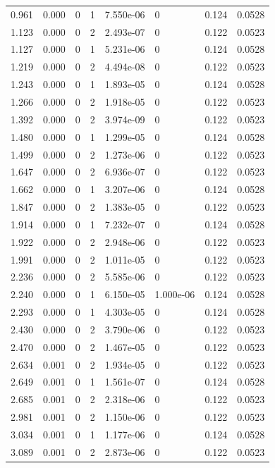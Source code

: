 \documentclass[preview]{standalone}
\begin{document}
{{\begin{tabular}{L{1.2cm}C{1.2cm} C{0.3cm}C{0.5cm} C{1.4cm}C{1.4cm} C{1.4cm}C{1.4cm}}
  0.961  &  0.000  & 0     &  1 &  7.550e-06  & 0  & 0.124 &  0.0528   \\ 
  1.123  &  0.000  & 0     &  2 &  2.493e-07  & 0  & 0.122 &  0.0523   \\ 
  1.127  &  0.000  & 0     &  1 &  5.231e-06  & 0  & 0.124 &  0.0528   \\ 
  1.219  &  0.000  & 0     &  2 &  4.494e-08  & 0  & 0.122 &  0.0523   \\ 
  1.243  &  0.000  & 0     &  1 &  1.893e-05  & 0  & 0.124 &  0.0528   \\ 
  1.266  &  0.000  & 0     &  2 &  1.918e-05  & 0  & 0.122 &  0.0523   \\ 
  1.392  &  0.000  & 0     &  2 &  3.974e-09  & 0  & 0.122 &  0.0523   \\ 
  1.480  &  0.000  & 0     &  1 &  1.299e-05  & 0  & 0.124 &  0.0528   \\ 
  1.499  &  0.000  & 0     &  2 &  1.273e-06  & 0  & 0.122 &  0.0523   \\ 
  1.647  &  0.000  & 0     &  2 &  6.936e-07  & 0  & 0.122 &  0.0523   \\ 
  1.662  &  0.000  & 0     &  1 &  3.207e-06  & 0  & 0.124 &  0.0528   \\ 
  1.847  &  0.000  & 0     &  2 &  1.383e-05  & 0  & 0.122 &  0.0523   \\ 
  1.914  &  0.000  & 0     &  1 &  7.232e-07  & 0  & 0.124 &  0.0528   \\ 
  1.922  &  0.000  & 0     &  2 &  2.948e-06  & 0  & 0.122 &  0.0523   \\ 
  1.991  &  0.000  & 0     &  2 &  1.011e-05  & 0  & 0.122 &  0.0523   \\ 
  2.236  &  0.000  & 0     &  2 &  5.585e-06  & 0  & 0.122 &  0.0523   \\ 
  2.240  &  0.000  & 0     &  1 &  6.150e-05  & 1.000e-06  & 0.124 &  0.0528   \\ 
  2.293  &  0.000  & 0     &  1 &  4.303e-05  & 0  & 0.124 &  0.0528   \\ 
  2.430  &  0.000  & 0     &  2 &  3.790e-06  & 0  & 0.122 &  0.0523   \\ 
  2.470  &  0.000  & 0     &  2 &  1.467e-05  & 0  & 0.122 &  0.0523   \\ 
  2.634  &  0.001  & 0     &  2 &  1.934e-05  & 0  & 0.122 &  0.0523   \\ 
  2.649  &  0.001  & 0     &  1 &  1.561e-07  & 0  & 0.124 &  0.0528   \\ 
  2.685  &  0.001  & 0     &  2 &  2.318e-06  & 0  & 0.122 &  0.0523   \\ 
  2.981  &  0.001  & 0     &  2 &  1.150e-06  & 0  & 0.122 &  0.0523   \\ 
  3.034  &  0.001  & 0     &  1 &  1.177e-06  & 0  & 0.124 &  0.0528   \\ 
  3.089  &  0.001  & 0     &  2 &  2.873e-06  & 0  & 0.122 &  0.0523   \\ 
\hline 
\end{tabular} 

}}
\end{document}
